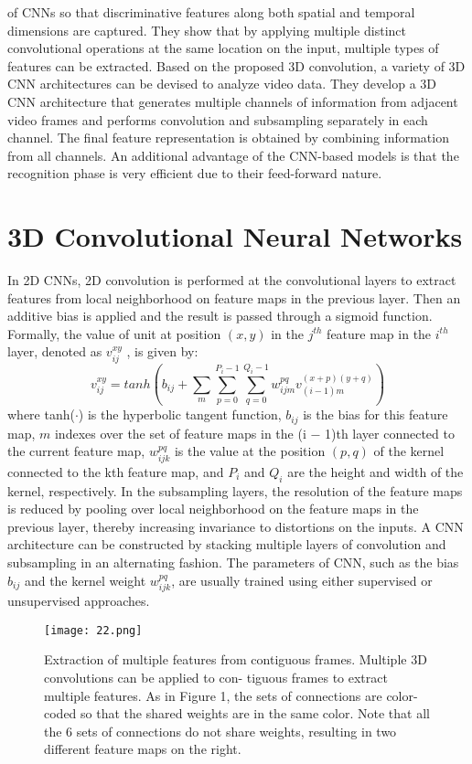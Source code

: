 \documentclass[10pt,twocolumn,letterpaper]{article}
\begin{document}
of CNNs so that discriminative features along both
spatial and temporal dimensions are captured. 
They show that by applying multiple distinct convolutional
operations at the same location on the input, multiple types of features can be extracted. Based on the proposed 3D convolution, a variety of 3D CNN architectures can be devised to analyze video data. They develop a 3D CNN architecture that generates multiple channels of information from adjacent video frames and performs convolution and subsampling separately in each channel. The final feature representation is obtained by combining information from all channels.
An additional advantage of the CNN-based models is that the recognition phase is very efficient due to their feed-forward nature.
\section{3D Convolutional Neural Networks}
In 2D CNNs, 2D convolution is performed at the convolutional layers to extract features from local neighborhood on feature maps in the previous layer. Then an additive bias is applied and the result is passed through a sigmoid function. Formally, the value of
unit at position $(x, y)$ in the $j^{th}$ feature map in the $i^{th}$ layer, denoted as $v_{ij}^{xy}$ , is given by:
\begin{equation}
v_{ij}^{xy}=tanh(b_{ij}+\sum_m\sum_{p=0}^{P_i-1}\sum_{q=0}^{Q_i-1}w_{ijm}^{pq}v^{(x+p)(y+q)}_{(i-1)m})
\end{equation}
where tanh($\cdot$) is the hyperbolic tangent function, $b_{ij}$ is the bias for this feature map, $m$ indexes over the
set of feature maps in the (i − 1)th layer connected to the current feature map, $w_{ijk}^{pq}$ is the value at the
position $(p, q)$ of the kernel connected to the kth feature map, and $P_i$ and $Q_i$ are the height and width of the kernel, respectively. In the subsampling layers, the resolution of the feature maps is reduced by pooling over local neighborhood on the feature maps in the previous layer, thereby increasing invariance to distortions on the inputs. A CNN architecture can be constructed by stacking multiple layers of convolution and subsampling in an alternating fashion. The parameters of CNN, such as the bias $b_{ij}$ and the kernel weight $w_ {ijk}^{pq}$, are usually trained using either supervised or unsupervised approaches.
  \begin{figure}[!htb]
  	\centering
  	\texttt{[image: 22.png]}\\
  	\caption{Extraction of multiple features from contiguous
  		frames. Multiple 3D convolutions can be applied to con-
  		tiguous frames to extract multiple features. As in Figure 1,
  		the sets of connections are color-coded so that the shared
  		weights are in the same color. Note that all the 6 sets of
  		connections do not share weights, resulting in two different
  		feature maps on the right.}\label{Figure2} 
  \end{figure}
\end{document}
